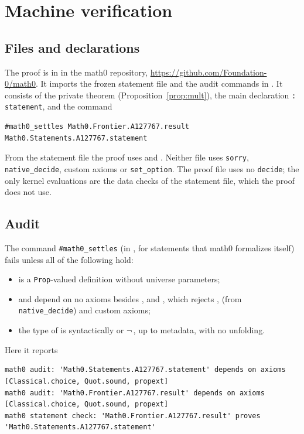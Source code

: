 \documentclass[11pt]{amsart}
\theoremstyle{plain}
\theoremstyle{definition}
\begin{document}
\section{Machine verification}\label{sec:lean}

\subsection*{Files and declarations}
The proof is in  in the math0 repository, \url{https://github.com/Foundation-0/math0}. It imports the frozen statement file  and the audit commands in . It consists of the private theorem  (Proposition~\ref{prop:mult}), the main declaration  \texttt{: statement}, and the command
\begin{lstlisting}
#math0_settles Math0.Frontier.A127767.result Math0.Statements.A127767.statement
\end{lstlisting}
From the statement file the proof uses  and . Neither file uses \texttt{sorry}, \texttt{native\_decide}, custom axioms or \texttt{set\_option}. The proof file uses no \texttt{decide}; the only kernel evaluations are the data checks of the statement file, which the proof does not use.

\subsection*{Audit}
The command \texttt{\#math0\_settles} (in , for statements that math0 formalizes itself) fails unless all of the following hold:
\begin{itemize}
\item {} is a \texttt{Prop}-valued definition without universe parameters;
\item {} and  depend on no axioms besides ,  and , which rejects ,  (from \texttt{native\_decide}) and custom axioms;
\item the type of  is syntactically  or $\neg$\,, up to metadata, with no unfolding.
\end{itemize}
Here it reports
\begin{lstlisting}[basicstyle=\ttfamily\scriptsize]
math0 audit: 'Math0.Statements.A127767.statement' depends on axioms [Classical.choice, Quot.sound, propext]
math0 audit: 'Math0.Frontier.A127767.result' depends on axioms [Classical.choice, Quot.sound, propext]
math0 statement check: 'Math0.Frontier.A127767.result' proves 'Math0.Statements.A127767.statement'
\end{lstlisting}
\end{document}
